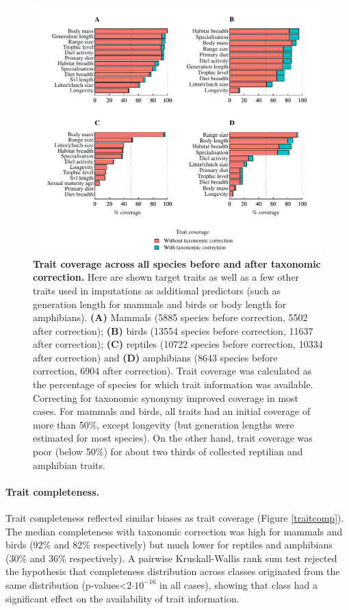 \begin{figure}[h!]
\centering
\includegraphics[scale=0.85]{figures/chapter2/Trait_coverage/Predictor_traits/All_species}
\caption[Trait coverage across all species before and after taxonomic correction]{\textbf{Trait coverage across all species before and after taxonomic correction.} Here are shown target traits as well as a few other traits used in imputations as additional predictors (such as generation length for mammals and birds or body length for amphibians). \textbf{(A)} Mammals (5885 species before correction, 5502 after correction); \textbf{(B)} birds (13554 species before correction, 11637 after correction); \textbf{(C)} reptiles (10722 species before correction, 10334 after correction) and \textbf{(D)}  amphibians (8643 species before correction, 6904 after correction). Trait coverage was calculated as the percentage of species for which trait information was available. Correcting for taxonomic synonymy improved coverage in most cases. For mammals and birds, all traits had an initial coverage of more than 50\%, except longevity (but generation lengths were estimated for most species). On the other hand, trait coverage was poor (below 50\%) for about two thirds of collected reptilian and amphibian traits.}
\label{traitcov}
\end{figure}

\paragraph{Trait completeness.}
 Trait completeness reflected similar biases as trait coverage (Figure \ref{traitcomp}). The median completeness with taxonomic correction was high for mammals and birds (92\% and 82\% respectively) but much lower for reptiles and amphibians (30\% and 36\% respectively). A pairwise Kruskall-Wallis rank sum test rejected the hypothesis that completeness distribution across classes originated from the same distribution (p-values<2$\cdot10^{-16}$ in all cases), showing that class had a significant effect on the availability of trait information. 

